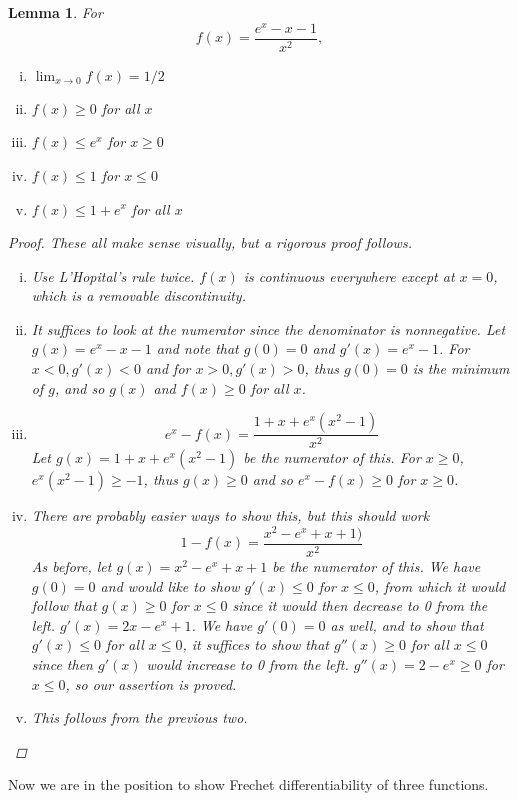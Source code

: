\documentclass[12pt]{article}
\newtheorem{lemma}{Lemma}
\begin{document}
\begin{lemma}\label{expineq}
For
\[
f(x) = \frac{e^x - x - 1}{x^2},
\]

\begin{enumerate}[(i)]
	\item $\lim_{x \rightarrow 0} f(x) = 1/2$
	\item $f(x) \geq 0$ for all $x$
	\item $f(x) \leq e^x$ for $x \geq 0$
	\item $f(x) \leq 1$ for $x \leq 0$
	\item $f(x) \leq 1 + e^x$ for all $x$
\end{enumerate}
\begin{proof}
These all make sense visually, but a rigorous proof follows.
\begin{enumerate}[(i)]
	\item Use L'Hopital's rule twice. $f(x)$ is continuous everywhere except at $x = 0$, which is a removable discontinuity.
	\item It suffices to look at the numerator since the denominator is nonnegative. Let $g(x) = e^x - x - 1$ and note that $g(0) = 0$ and $g'(x) = e^x - 1$. For $x < 0, g'(x) < 0$ and for $x > 0, g'(x) > 0$, thus $g(0) = 0$ is the minimum of $g$, and so $g(x)$ and $f(x) \geq 0$ for all $x$.
	\item 
	\[
	e^x - f(x) = \frac{1 + x + e^x (x^2 - 1)}{x^2}
	\]
	Let $g(x) = 1 + x + e^x (x^2 - 1)$ be the numerator of this. For $x \geq 0$, $e^x (x^2 - 1) \geq -1$, thus $g(x) \geq 0$ and so $e^x - f(x) \geq 0$ for $x \geq 0$.
	\item There are probably easier ways to show this, but this should work
	\[
	1 - f(x) = \frac{x^2 - e^x + x + 1)}{x^2}
	\]
	As before, let $g(x) = x^2 - e^x + x + 1$ be the numerator of this. We have $g(0) = 0$ and would like to show $g'(x) \leq 0$ for $x \leq 0$, from which it would follow that $g(x) \geq 0$ for $x 
	\leq 0$ since it would then decrease to 0 from the left. $g'(x) = 2x - e^x + 1$. We have $g'(0) = 0$ as well, and to show that $g'(x) \leq 0$ for all $x \leq 0$, it suffices to show that $g''(x) \geq 0$ for all $x \leq 0$ since then $g'(x)$ would increase to 0 from the left. $g''(x) = 2 - e^x \geq 0$ for $x \leq 0$, so our assertion is proved.
	\item This follows from the previous two.
\end{enumerate}
\end{proof}
\end{lemma}

Now we are in the position to show Frechet differentiability of three functions.
\end{document}
